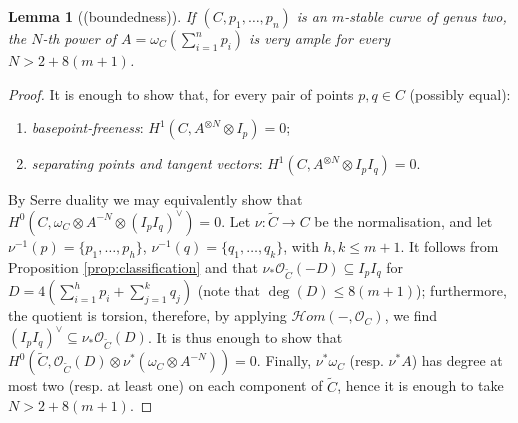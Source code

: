 \documentclass{compositio}
\newcommand{\OO}{\mathcal O}
\renewcommand{\to}{\rightarrow}
\newcommand{\hhom}{\mathcal{H}\!om}
\theoremstyle{plain}
\newtheorem{lem}[thm]{Lemma}
\theoremstyle{definition}
\theoremstyle{remark}
\begin{document}
\begin{lem}[(boundedness)]\label{lem:boundedness}
 If $(C,p_1,\ldots,p_n)$ is an $m$-stable curve of genus two, the $N$-th power of $A=\omega_C(\sum_{i=1}^np_i)$ is very ample for every $N>2+8(m+1)$.
\end{lem}
\begin{proof}
 It is enough to show that, for every pair of points $p,q\in C$ (possibly equal):
 \begin{enumerate}
  \item \emph{basepoint-freeness}: $H^1(C,A^{\otimes N}\otimes I_p)=0$;
  \item \emph{separating points and tangent vectors}: $H^1(C,A^{\otimes N}\otimes I_pI_q)=0$.
 \end{enumerate}
By Serre duality we may equivalently show that $H^0(C,\omega_C\otimes A^{-N}\otimes(I_pI_q)^\vee)=0$. Let $\nu\colon\tilde C\to C$ be the normalisation, and let $\nu^{-1}(p)=\{p_1,\ldots,p_h\}$, $\nu^{-1}(q)=\{q_1,\ldots,q_k\}$, with $h,k\leq m+1$. It follows from Proposition \ref{prop:classification} and \cite[Proposition A.3]{SMY1} that $\nu_*\OO_{\tilde C}(-D)\subseteq I_pI_q$ for $D=4(\sum_{i=1}^hp_i+\sum_{j=1}^kq_j)$ (note that $\deg(D)\leq 8(m+1)$); furthermore, the quotient is torsion, therefore, by applying $\hhom(-,\OO_C)$, we find $(I_pI_q)^\vee\subseteq\nu_*\OO_{\tilde C}(D)$. It is thus enough to show that $H^0(\tilde C,\OO_{\tilde C}(D)\otimes\nu^*(\omega_C\otimes A^{-N}))=0$. Finally, $\nu^*\omega_C$ (resp. $\nu^*A$) has degree at most two (resp. at least one) on each component of $\tilde C$, hence it is enough to take $N>2+8(m+1)$.
\end{proof}
\end{document}
